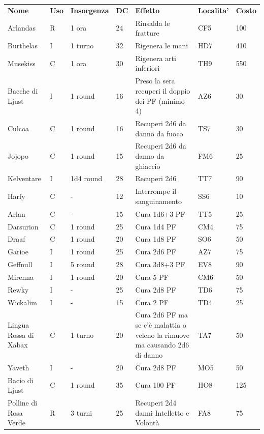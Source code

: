 \documentclass[a4paper,11pt,twoside,openany]{book}
\begin{document}
{\begin{longtable}{|L{3.2cm} |k{0.7cm} |k{1.7cm}| D{1cm} |L{5cm} |k{1.5cm} |k{1cm}|}
	\textbf{Nome} & \textbf{Uso} & \textbf{Insorgenza} & \textbf{DC} & \textbf{Effetto} & \textbf{Localita'} & \textbf{Costo}\\
Arlandas & R & 1 ora & 24 & Rinsalda le fratture & CF5 & 100\\
Burthelas  & I & 1 turno & 32 & Rigenera le mani & HD7 & 410\\
Musekiss& C & 1 ora & 30 & Rigenera arti inferiori & TH9 & 550\\
Bacche di Ljust  & I & 1 round & 16 & Preso la sera recuperi il doppio dei PF (minimo 4)& AZ6 & 30\\
Culcoa& C & 1 round & 16 & Recuperi 2d6 da danno da fuoco & TS7 & 30\\
Jojopo & C & 1 round & 15 & Recuperi 2d6 da danno da ghiaccio & FM6 & 25\\
Kelventare & I & 1d4 round & 28 & Recuperi 2d6 & TT7 & 90\\
Harfy  & C & - & 12 & Interrompe il sanguinamento & SS6 & 10\\
Arlan & C & - & 15 & Cura 1d6+3 PF & TT5 & 25\\
Darsurion & C & 1 round & 25 & Cura 1d4 PF & CM4 & 75\\
Draaf  & C & 1 round & 20 & Cura 1d8 PF & SO6 & 50\\
Garioe & I & 1 round & 25 & Cura 2d6 PF & AZ7 & 75\\
Geffnull & I & 5 round & 28 & Cura 3d8+3 PF & EV8 & 90\\
Mirenna & I & 1 round & 20 & Cura 5 PF & CM6 & 50\\
Rewky & I & - & 25 & Cura 2d8 PF & TD6 & 75\\
Wickalim & I & - & 15 & Cura 2 PF & TD4 & 25\\
Lingua Rossa di Xabax& C & 1 turno & 20 & Cura 2d6 PF ma se c'è malattia o veleno la rimuove ma causando 2d6 di danno& TA7 & 50\\
Yaveth & I & - & 20 & Cura 2d8 PF & MO5 & 50\\
Bacio di Ljust & C & 1 round & 35 & Cura 100 PF & HO8 & 125\\
Polline di Rosa Verde & R & 3 turni & 25 & Recuperi 2d4 danni Intelletto e Volontà & FA8 & 75\\

\end{longtable}}
\end{document}
